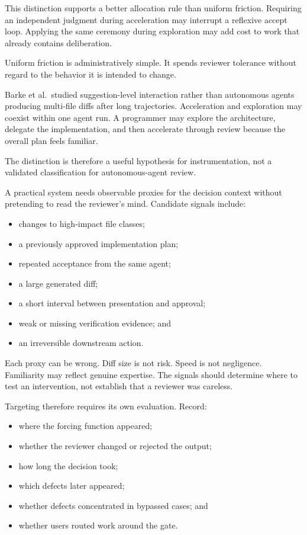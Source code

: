 This distinction supports a better allocation rule than uniform friction. Requiring an independent judgment during acceleration may interrupt a reflexive accept loop. Applying the same ceremony during exploration may add cost to work that already contains deliberation.

Uniform friction is administratively simple. It spends reviewer tolerance without regard to the behavior it is intended to change.

Barke et al.~studied suggestion-level interaction rather than autonomous agents producing multi-file diffs after long trajectories. Acceleration and exploration may coexist within one agent run. A programmer may explore the architecture, delegate the implementation, and then accelerate through review because the overall plan feels familiar.

The distinction is therefore a useful hypothesis for instrumentation, not a validated classification for autonomous-agent review.

A practical system needs observable proxies for the decision context without pretending to read the reviewer's mind. Candidate signals include:

\begin{itemize}
\tightlist
\item
  changes to high-impact file classes;
\item
  a previously approved implementation plan;
\item
  repeated acceptance from the same agent;
\item
  a large generated diff;
\item
  a short interval between presentation and approval;
\item
  weak or missing verification evidence; and
\item
  an irreversible downstream action.
\end{itemize}

Each proxy can be wrong. Diff size is not risk. Speed is not negligence. Familiarity may reflect genuine expertise. The signals should determine where to test an intervention, not establish that a reviewer was careless.

Targeting therefore requires its own evaluation. Record:

\begin{itemize}
\tightlist
\item
  where the forcing function appeared;
\item
  whether the reviewer changed or rejected the output;
\item
  how long the decision took;
\item
  which defects later appeared;
\item
  whether defects concentrated in bypassed cases; and
\item
  whether users routed work around the gate.
\end{itemize}

